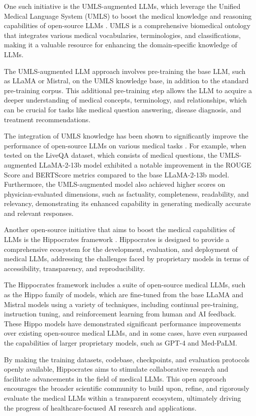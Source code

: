 \documentclass[11pt]{article}
\begin{document}
One such initiative is the UMLS-augmented LLMs, which leverage the Unified Medical Language System (UMLS) to boost the medical knowledge and reasoning capabilities of open-source LLMs \cite{ref210}. UMLS is a comprehensive biomedical ontology that integrates various medical vocabularies, terminologies, and classifications, making it a valuable resource for enhancing the domain-specific knowledge of LLMs.

The UMLS-augmented LLM approach involves pre-training the base LLM, such as LLaMA or Mistral, on the UMLS knowledge base, in addition to the standard pre-training corpus. This additional pre-training step allows the LLM to acquire a deeper understanding of medical concepts, terminology, and relationships, which can be crucial for tasks like medical question answering, disease diagnosis, and treatment recommendations.

The integration of UMLS knowledge has been shown to significantly improve the performance of open-source LLMs on various medical tasks \cite{ref210}. For example, when tested on the LiveQA dataset, which consists of medical questions, the UMLS-augmented LLaMA-2-13b model exhibited a notable improvement in the ROUGE Score and BERTScore metrics compared to the base LLaMA-2-13b model. Furthermore, the UMLS-augmented model also achieved higher scores on physician-evaluated dimensions, such as factuality, completeness, readability, and relevancy, demonstrating its enhanced capability in generating medically accurate and relevant responses.

Another open-source initiative that aims to boost the medical capabilities of LLMs is the Hippocrates framework \cite{ref86}. Hippocrates is designed to provide a comprehensive ecosystem for the development, evaluation, and deployment of medical LLMs, addressing the challenges faced by proprietary models in terms of accessibility, transparency, and reproducibility.

The Hippocrates framework includes a suite of open-source medical LLMs, such as the Hippo family of models, which are fine-tuned from the base LLaMA and Mistral models using a variety of techniques, including continual pre-training, instruction tuning, and reinforcement learning from human and AI feedback. These Hippo models have demonstrated significant performance improvements over existing open-source medical LLMs, and in some cases, have even surpassed the capabilities of larger proprietary models, such as GPT-4 and Med-PaLM.

By making the training datasets, codebase, checkpoints, and evaluation protocols openly available, Hippocrates aims to stimulate collaborative research and facilitate advancements in the field of medical LLMs. This open approach encourages the broader scientific community to build upon, refine, and rigorously evaluate the medical LLMs within a transparent ecosystem, ultimately driving the progress of healthcare-focused AI research and applications.
\end{document}
